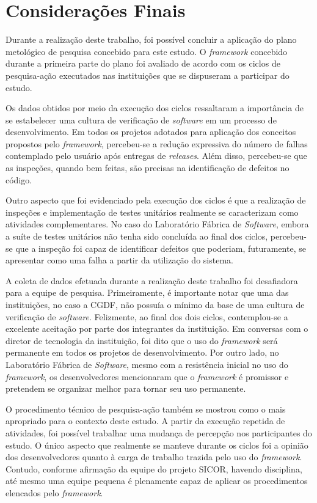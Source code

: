 \chapter{Considerações Finais}

Durante a realização deste trabalho, foi possível concluir a aplicação do plano metológico de pesquisa concebido para este estudo. O \textit{framework} concebido durante a primeira parte do plano foi avaliado de acordo com os ciclos de pesquisa-ação executados nas instituições que se dispuseram a participar do estudo.

Os dados obtidos por meio da execução dos ciclos ressaltaram a importância de se estabelecer uma cultura de verificação de \textit{software} em um processo de desenvolvimento. Em todos os projetos adotados para aplicação dos conceitos propostos pelo \textit{framework}, percebeu-se a redução expressiva do número de falhas contemplado pelo usuário após entregas de \textit{releases}. Além disso, percebeu-se que as inspeções, quando bem feitas, são precisas na identificação de defeitos no código.

Outro aspecto que foi evidenciado pela execução dos ciclos é que a realização de inspeções e implementação de testes unitários realmente se caracterizam como atividades complementares. No caso do Laboratório Fábrica de \textit{Software}, embora a suíte de testes unitários não tenha sido concluída ao final dos ciclos, percebeu-se que a inspeção foi capaz de identificar defeitos que poderiam, futuramente, se apresentar como uma falha a partir da utilização do sistema.

A coleta de dados efetuada durante a realização deste trabalho foi desafiadora para a equipe de pesquisa. Primeiramente, é importante notar que uma das instituições, no caso a CGDF, não possuía o mínimo da base de uma cultura de verificação de \textit{software}. Felizmente, ao final dos dois ciclos, contemplou-se a excelente aceitação por parte dos integrantes da instituição. Em conversas com o diretor de tecnologia da instituição, foi dito que o uso do \textit{framework} será permanente em todos os projetos de desenvolvimento. Por outro lado, no Laboratório Fábrica de \textit{Software}, mesmo com a resistência inicial no uso do \textit{framework}, os desenvolvedores mencionaram que o \textit{framework} é promissor e pretendem se organizar melhor para tornar seu uso permanente.

O procedimento técnico de pesquisa-ação também se mostrou como o mais apropriado para o contexto deste estudo. A partir da execução repetida de atividades, foi possível trabalhar uma mudança de percepção nos participantes do estudo. O único aspecto que realmente se manteve durante os ciclos foi a opinião dos desenvolvedores quanto à carga de trabalho trazida pelo uso do \textit{framework}. Contudo, conforme afirmação da equipe do projeto SICOR, havendo disciplina, até mesmo uma equipe pequena é plenamente capaz de aplicar os procedimentos elencados pelo \textit{framework}.

